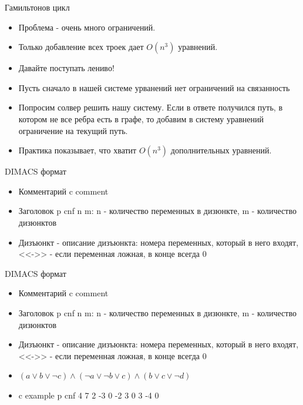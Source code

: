 \documentclass{beamer}
\begin{document}
\begin{frame}{Гамильтонов цикл}
\begin{itemize}
\item Проблема - очень много ограничений.
\item Только добавление всех троек дает $O(n^3)$ уравнений.
\item Давайте поступать лениво!
\item Пусть сначало в нашей системе урванений нет ограничений на связанность
\item Попросим солвер решить нашу систему. Если в ответе получился путь, в котором не все ребра есть в графе, то добавим в
систему уравнений ограничение на текущий путь.
\item Практика показывает, что хватит $O(n^3)$ дополнительных уравнений.
\end{itemize}
\end{frame}

\begin{frame}{DIMACS формат}
\begin{itemize}
\item Комментарий c comment
\item Заголовок p cnf n m: n - количество переменных в дизюнкте, m - количество дизюнктов
\item Дизъюнкт - описание дизъюнкта: номера переменных, который в него входят, <<->> - если переменная ложная, в конце всегда 0
\end{itemize}
\end{frame}

\begin{frame}{DIMACS формат}
\begin{itemize}
\item Комментарий c comment
\item Заголовок p cnf n m: n - количество переменных в дизюнкте, m - количество дизюнктов
\item Дизъюнкт - описание дизъюнкта: номера переменных, который в него входят, <<->> - если переменная ложная, в конце всегда 0
\item $(a \vee b \vee \lnot c) \wedge (\lnot a \vee \lnot b \vee c) \wedge (b \vee c \vee \lnot d)$
\item c example\newline
p cnf 4 7 2 -3 0 -2 3 0 3 -4 0\newline
\end{itemize}
\end{frame}
\end{document}
